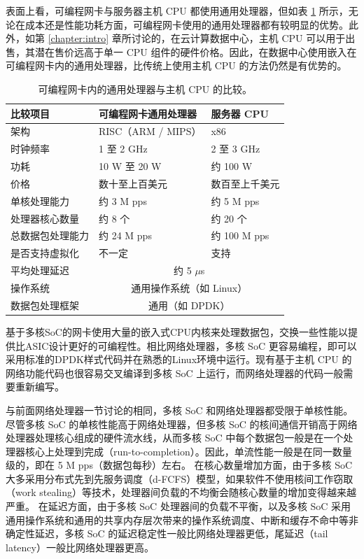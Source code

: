 表面上看，可编程网卡与服务器主机 CPU 都使用通用处理器，但如表 \ref{background:tab:host-cpu} 所示，无论在成本还是性能功耗方面，可编程网卡使用的通用处理器都有较明显的优势。此外，如第 \ref{chapter:intro} 章所讨论的，在云计算数据中心，主机 CPU 可以用于出售，其潜在售价远高于单一 CPU 组件的硬件价格。因此，在数据中心使用嵌入在可编程网卡内的通用处理器，比传统上使用主机 CPU 的方法仍然是有优势的。

\begin{table}[htbp]
	\begin{tabular}{l|p{}|p{}}
		\hline
		比较项目 & 可编程网卡通用处理器 & 服务器 CPU \\
		\hline
		\hline
		架构 & RISC（ARM / MIPS） & x86 \\
		\hline
		时钟频率 & 1 至 2 GHz & 2 至 3 GHz  \\
		\hline
		功耗 & 10 W 至 20 W & 约 100 W \\
		\hline
		价格 & 数十至上百美元 & 数百至上千美元 \\
		\hline
		单核处理能力 & 约 3 M pps & 约 5 M pps \\
		\hline
		处理器核心数量 & 约 8 个 & 约 20 个 \\
		\hline
		总数据包处理能力 & 约 24 M pps & 约 100 M pps \\
		\hline
		是否支持虚拟化 & 不一定 & 支持 \\
		\hline
		平均处理延迟 & \multicolumn{2}{c}{约 5 $\mu$s} \\
		\hline
		操作系统 & \multicolumn{2}{c}{通用操作系统（如 Linux）} \\
		\hline 
		数据包处理框架 & \multicolumn{2}{c}{通用（如 DPDK）} \\
		\hline
	\end{tabular}
	\caption{可编程网卡内的通用处理器与主机 CPU 的比较。}
	\label{background:tab:host-cpu}
\end{table}


基于多核SoC的网卡使用大量的嵌入式CPU内核来处理数据包，交换一些性能以提供比ASIC设计更好的可编程性。相比网络处理器，多核 SoC 更容易编程，即可以采用标准的DPDK样式代码并在熟悉的Linux环境中运行。现有基于主机 CPU 的网络功能代码也很容易交叉编译到多核 SoC 上运行，而网络处理器的代码一般需要重新编写。

与前面网络处理器一节讨论的相同，多核 SoC 和网络处理器都受限于单核性能。
尽管多核 SoC 的单核性能高于网络处理器，但多核 SoC 的核间通信开销高于网络处理器处理核心组成的硬件流水线，从而多核 SoC 中每个数据包一般是在一个处理器核心上处理到完成（run-to-completion）。因此，单流性能一般是在同一数量级的，即在 5 M pps（数据包每秒）左右。
在核心数量增加方面，由于多核 SoC 大多采用分布式先到先服务调度（d-FCFS）模型，如果软件不使用核间工作窃取（work stealing）等技术，处理器间负载的不均衡会随核心数量的增加变得越来越严重。
在延迟方面，由于多核 SoC 处理器间的负载不平衡，以及多核 SoC 采用通用操作系统和通用的共享内存层次带来的操作系统调度、中断和缓存不命中等非确定性延迟，多核 SoC 的延迟稳定性一般比网络处理器更低，尾延迟（tail latency）一般比网络处理器更高。

